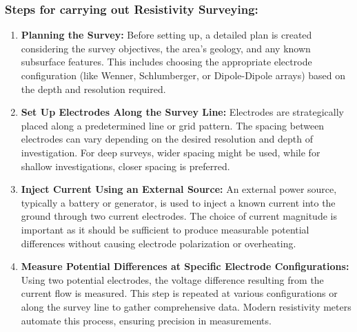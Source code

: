 \documentclass[12pt,a4paper]{report}
\begin{document}
\subsubsection{Steps for carrying out Resistivity Surveying:}
\begin{enumerate}
    \item \textbf{Planning the Survey:} Before setting up, a detailed plan is created considering the survey objectives, the area's geology, and any known subsurface features. This includes choosing the appropriate electrode configuration (like Wenner, Schlumberger, or Dipole-Dipole arrays) based on the depth and resolution required.

    \item \textbf{Set Up Electrodes Along the Survey Line:} Electrodes are strategically placed along a predetermined line or grid pattern. The spacing between electrodes can vary depending on the desired resolution and depth of investigation. For deep surveys, wider spacing might be used, while for shallow investigations, closer spacing is preferred.

    \item \textbf{Inject Current Using an External Source:} An external power source, typically a battery or generator, is used to inject a known current into the ground through two current electrodes. The choice of current magnitude is important as it should be sufficient to produce measurable potential differences without causing electrode polarization or overheating.

    \item \textbf{Measure Potential Differences at Specific Electrode Configurations:} Using two potential electrodes, the voltage difference resulting from the current flow is measured. This step is repeated at various configurations or along the survey line to gather comprehensive data. Modern resistivity meters automate this process, ensuring precision in measurements.


\end{enumerate}
\end{document}
